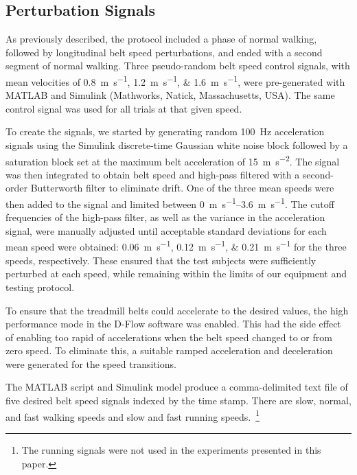 \documentclass[fleqn,12pt]{wlpeerj}
\begin{document}
\subsection*{Perturbation Signals}
%
As previously described, the protocol included a phase of normal walking,
followed by longitudinal belt speed perturbations, and ended with a second
segment of normal walking. Three pseudo-random belt speed control signals, with
mean velocities of \SIlist{0.8;1.2;1.6}{\meter\per\second}, were pre-generated
with MATLAB and Simulink (Mathworks, Natick, Massachusetts, USA). The same
control signal was used for all trials at that given speed.

To create the signals, we started by generating random 100~\si{\hertz}
acceleration signals using the Simulink discrete-time Gaussian white noise
block followed by a saturation block set at the maximum belt acceleration of
15~\si{\meter\per\second\squared}. The signal was then integrated to obtain
belt speed and high-pass filtered with a second-order Butterworth filter to
eliminate drift. One of the three mean speeds were then added to the signal and
limited between \SIrange{0}{3.6}{\meter\per\second}. The cutoff frequencies of
the high-pass filter, as well as the variance in the acceleration signal, were
manually adjusted until acceptable standard deviations for each mean speed were
obtained: \SIlist{0.06;0.12;0.21}{\meter\per\second} for the three speeds,
respectively. These ensured that the test subjects were sufficiently perturbed
at each speed, while remaining within the limits of our equipment and testing
protocol.

To ensure that the treadmill belts could accelerate to the desired values, the
high performance mode in the D-Flow software was enabled. This had the side
effect of enabling too rapid of accelerations when the belt speed changed to or
from zero speed. To eliminate this, a suitable ramped acceleration and
deceleration were generated for the speed transitions.

The MATLAB script and Simulink model produce a comma-delimited text file of
five desired belt speed signals indexed by the time stamp. There are slow, normal,
and fast walking speeds and slow and fast running speeds.~\footnote{The running
signals were not used in the experiments presented in this paper.}
\end{document}
